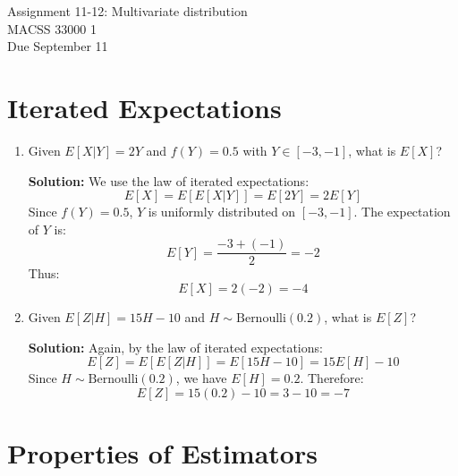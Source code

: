\documentclass[12pt]{article}
\begin{document}
	\begin{center}
		Assignment 11-12: Multivariate distribution\\
        MACSS 33000 1 \\
		Due September 11 \\
	\end{center}


\section{Iterated Expectations}

\begin{enumerate}
    \item Given \( E[X|Y] = 2Y \) and \( f(Y) = 0.5 \) with \( Y \in [-3, -1] \), what is \( E[X] \)?
    
    \textbf{Solution:}
We use the law of iterated expectations:
\[
E[X] = E[E[X|Y]] = E[2Y] = 2E[Y]
\]
Since \( f(Y) = 0.5 \), \( Y \) is uniformly distributed on \( [-3, -1] \). The expectation of \( Y \) is:
\[
E[Y] = \frac{-3 + (-1)}{2} = -2
\]
Thus:
\[
E[X] = 2(-2) = -4
\]
    \item  Given \( E[Z|H] = 15H - 10 \) and \( H \sim \text{Bernoulli}(0.2) \), what is \( E[Z] \)?

\textbf{Solution:}
Again, by the law of iterated expectations:
\[
E[Z] = E[E[Z|H]] = E[15H - 10] = 15E[H] - 10
\]
Since \( H \sim \text{Bernoulli}(0.2) \), we have \( E[H] = 0.2 \). Therefore:
\[
E[Z] = 15(0.2) - 10 = 3 - 10 = -7
\]

\end{enumerate}


\section{Properties of Estimators}
\end{document}
